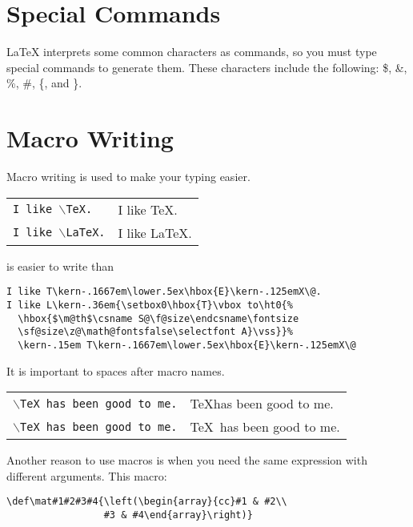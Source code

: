 \documentclass[12pt]{article}   %
\theoremstyle{plain}
\begin{document}
\section{Special Commands}\label{sec:commands}

{\LaTeX} interprets some common characters as commands, so you must type
special commands to generate them.  These characters include the
following: \$, \&, \%, \#, \{, and \}.

\section{Macro Writing}

Macro writing is used to make your typing easier.  

\begin{tabular}{ll}
\texttt{I like $\backslash$TeX.} & I like \TeX.\\
\texttt{I like $\backslash$LaTeX.} & I like \LaTeX.\\
\end{tabular}

\noindent
is easier to write than

\begin{verbatim}
I like T\kern-.1667em\lower.5ex\hbox{E}\kern-.125emX\@.
I like L\kern-.36em{\setbox0\hbox{T}\vbox to\ht0{%
  \hbox{$\m@th$\csname S@\f@size\endcsname\fontsize
  \sf@size\z@\math@fontsfalse\selectfont A}\vss}}%
  \kern-.15em T\kern-.1667em\lower.5ex\hbox{E}\kern-.125emX\@
\end{verbatim}

It is important to spaces after macro names.

\begin{tabular}{ll}
\texttt{$\backslash$TeX has been good to me.}  & \TeX has been good to me.\\
\texttt{$\backslash$TeX\ has been good to me.}  & \TeX\ has been good to me.
\end{tabular}

\noindent
Another reason to use macros is when you need the same expression with different arguments.  This macro:
\begin{verbatim}
\def\mat#1#2#3#4{\left(\begin{array}{cc}#1 & #2\\ 
                 #3 & #4\end{array}\right)}
\end{verbatim}

\def\mat#1#2#3#4{\left(\begin{array}{cc}#1 & #2\\ #3 & #4\end{array}\right)}
\end{document}
